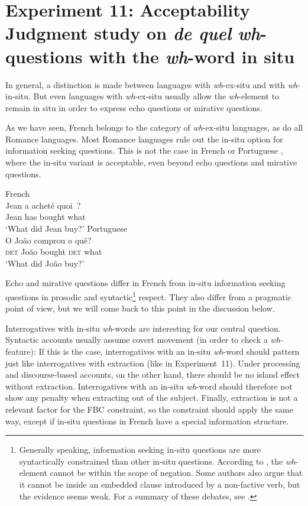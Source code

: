 \section[head=Experiment 11]{Experiment 11: Acceptability Judgment study on \emph{de quel} \emph{wh}-questions with the \emph{wh}-word in situ}
\label{ch:exp11}

In general, a distinction is made between languages with \textit{wh}-ex-situ and with \textit{wh}-in-situ. But even languages with \textit{wh}-ex-situ usually allow the \textit{wh}-element to remain in situ in order to express echo questions or mirative questions.

As we have seen, French belongs to the category of \textit{wh}-ex-situ languages, as do all Romance languages. Most Romance languages rule out the in-situ option for information seeking questions. This is not the case in French \citep{Cheng.2000} or Portuguese \citep{Ambar.2002}, where the in-situ variant is acceptable, even beyond echo questions and mirative questions.

\eal
\ex French\\ 
\gll Jean a acheté quoi~?\\
Jean has bought what\\
\glt `What did Jean buy?'
\label{ex:in-situ-French}
\ex Portuguese \citep{Kaiser.2015}\\
\gll O Jo\~{a}o comprou o quê?\\
\textsc{det} Jo\~{a}o bought \textsc{det} what\\
\glt `What did Jo\~{a}o buy?'
\label{ex:in-situ-Portugese}
\zl 

Echo and mirative questions differ in French from in-situ information seeking questions in prosodic and syntactic\footnote{Generally speaking, information seeking in-situ questions are more syntactically constrained than other in-situ questions. According to \citet{Schlonsky.2012}, the \textit{wh}-element cannot be within the scope of negation. Some authors also argue that it cannot be inside an embedded clause introduced by a non-factive verb, but the evidence seems weak. For a summary of these debates, see \citet{Kaiser.2015}.} respect. They also differ from a pragmatic point of view, but we will come back to this point in the discussion below.

Interrogatives with in-situ \emph{wh}-words are interesting for our central question. Syntactic accounts usually assume covert movement (in order to check a \textit{wh-} feature): If this is the case, interrogatives with an in-situ \emph{wh}-word should pattern just like interrogatives with extraction (like in Experiment~11). Under processing and discourse-based accounts, on the other hand, there should be no island effect without extraction. Interrogatives with an in-situ \emph{wh}-word should therefore not show any penalty when extracting out of the subject. Finally, extraction is not a relevant factor for the FBC constraint, so the constraint should apply the same way, except if in-situ questions in French have a special information structure.

